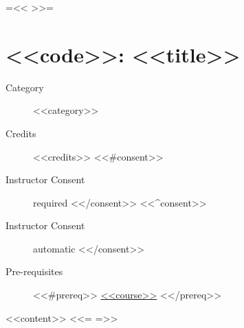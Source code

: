 {{=<< >>=}}
\chapter{\sc <<code>>: <<title>>} \label{syllabus:<<code>>}
\begin{description}
\item[Category]
<<category>>
\item[Credits]
  <<credits>>
  <<#consent>>
\item[Instructor Consent]
  required
  <</consent>>
  <<^consent>>
\item[Instructor Consent]
  automatic
  <</consent>>
\item[Pre-requisites]
  <<#prereq>> \hyperlink{syllabus:<<course>>}{<<course>>} <</prereq>>
\end{description}
<<content>>
<<={{ }}=>>
